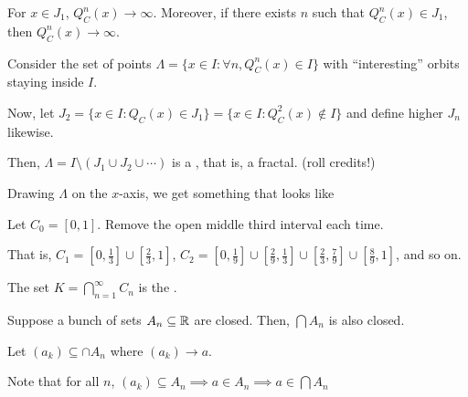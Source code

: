 \documentclass[class=pmath370,tikz,notes]{agony}
\begin{document}
For $x \in J_1$, $Q_C^n(x) \to \infty$.
Moreover, if there exists $n$ such that $Q_C^n(x) \in J_1$,
then $Q_C^n(x) \to \infty$.

Consider the set of points $\Lambda = \{x \in I : \forall n, Q_C^n(x) \in I\}$
with ``interesting'' orbits staying inside $I$.

Now, let $J_2 = \{x \in I : Q_C(x) \in J_1\} = \{x \in I : Q_C^2(x) \not\in I\}$
and define higher $J_n$ likewise.

Then, $\Lambda = I \setminus (J_1 \cup J_2 \cup \dotsb)$
is a , that is, a fractal. {\tiny (roll credits!)}

Drawing $\Lambda$ on the $x$-axis, we get something that looks like
\begin{center}
\end{center}


\begin{defn*}\label{def:cantor}
  Let $C_0 = [0,1]$. Remove the open middle third interval each time.

  That is, $C_1 = [0,\frac13] \cup [\frac23,1]$,
  $C_2 = [0,\frac19] \cup [\frac29,\frac13] \cup [\frac23,\frac79] \cup [\frac89,1]$,
  and so on.

  The set $K = \bigcap_{n=1}^\infty C_n$ is the .
\end{defn*}

\begin{prop}
  Suppose a bunch of sets $A_n \subseteq \mathbb{R}$ are closed.
  Then, $\bigcap A_n$ is also closed.
\end{prop}
\begin{prf}
  Let $(a_k) \subseteq \cap A_n$ where $(a_k) \to a$.

  Note that for all $n$, $(a_k) \subseteq A_n \implies a \in A_n \implies a \in \bigcap A_n$
\end{prf}
\end{document}
